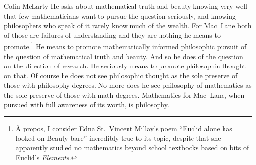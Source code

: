 \begin{artengenv}{Colin McLarty}
He asks about mathematical truth and beauty knowing very well that few mathematicians want to pursue the question seriously, and knowing philosophers who speak of it rarely know much of the wealth.  For Mac~Lane both of those are failures of understanding and they are nothing he means to promote.\footnote{À propos, I consider Edna St.~Vincent Millay's poem ``Euclid alone has looked on Beauty bare'' incredibly true to its topic, despite that she apparently studied no mathematics beyond school textbooks based on bits of Euclid's \textit{Elements}.}  He means to promote mathematically informed philosophic pursuit of the question of mathematical truth and beauty.  And so he does of the question on the direction of research.  He seriously means to promote philosophic thought on that.  Of course he does not see philosophic thought as the sole preserve of those with philosophy degrees.  No more does he see philosophy of mathematics as the sole preserve of those with math degrees.   Mathematics for Mac~Lane, when pursued with full awareness of its worth, is philosophy.

\end{artengenv}
